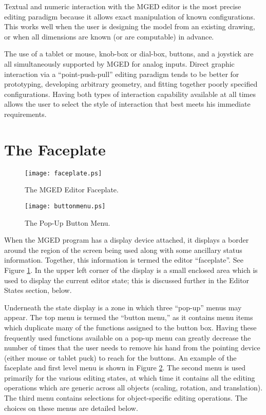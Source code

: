 Textual and numeric interaction with the MGED editor is the most
precise editing paradigm because it allows exact
manipulation of known configurations.
This works well when the user is designing the model
from an existing drawing, or when all dimensions are known (or are computable)
in advance.

The use of a
tablet or mouse, knob-box or dial-box, buttons, and a joystick
are all simultaneously supported by MGED for analog inputs.
Direct graphic interaction via a ``point-push-pull'' editing paradigm
tends to be better for
prototyping, developing arbitrary geometry, and fitting
together poorly specified configurations.
Having both types of interaction capability available at all times
allows the user to select the style of interaction that best
meets his immediate requirements.

\section{The Faceplate}

\begin{figure}
\centering \texttt{[image: faceplate.ps]}
\caption{The MGED Editor Faceplate.}
\label{faceplate}
\end{figure}

\begin{figure}
\centering \texttt{[image: buttonmenu.ps]}
\caption{The Pop-Up Button Menu.}
\label{buttonmenu}
\end{figure}

When the MGED program has a display device attached, it
displays a border around the region of the screen being used
along with some ancillary status information.  Together, this
information is termed the editor ``faceplate''.
See Figure \ref{faceplate}.
In the upper left corner of the display is a small enclosed area
which is used to display the current editor state;
this is discussed further in the Editor States section, below.

Underneath the state display is a zone in which three ``pop-up'' menus
may appear.
The top menu is termed the ``button menu,'' as it
contains menu items which duplicate many of the functions assigned to
the button box.
Having these frequently used
functions available on a pop-up menu
can greatly decrease the number of times that the user needs to remove
his hand from the pointing device (either mouse or tablet puck)
to reach for the buttons.
An example of the faceplate and first level menu is shown in
Figure \ref{buttonmenu}.
The second menu is used primarily for the various editing states,
at which time it contains all the editing operations which are generic
across all objects (scaling, rotation, and translation).
The third menu contains selections for object-specific editing operations.
The choices on these menus are detailed below.

